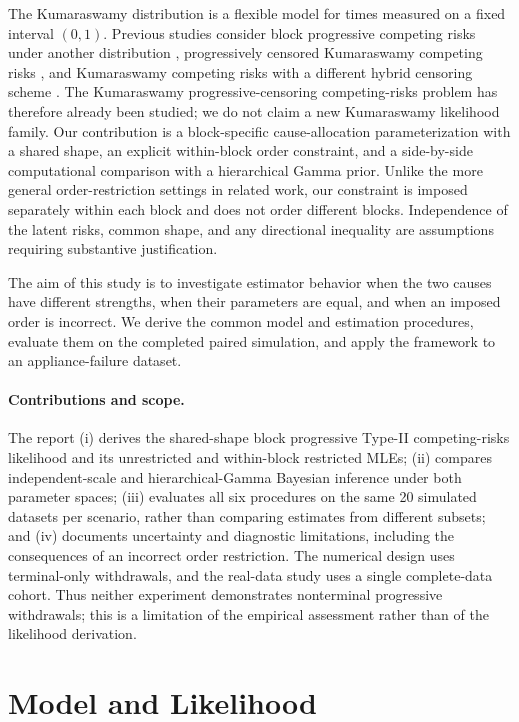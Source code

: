 \documentclass[a4paper,11pt]{article}
\begin{document}
The Kumaraswamy distribution is a flexible model for times measured on a fixed interval $(0,1)$. Previous studies consider block progressive competing risks under another distribution \cite{wang2023}, progressively censored Kumaraswamy competing risks \cite{wang2018}, and Kumaraswamy competing risks with a different hybrid censoring scheme \cite{mahto2022}. The Kumaraswamy progressive-censoring competing-risks problem has therefore already been studied; we do not claim a new Kumaraswamy likelihood family. Our contribution is a block-specific cause-allocation parameterization with a shared shape, an explicit within-block order constraint, and a side-by-side computational comparison with a hierarchical Gamma prior. Unlike the more general order-restriction settings in related work, our constraint is imposed separately within each block and does not order different blocks. Independence of the latent risks, common shape, and any directional inequality are assumptions requiring substantive justification.

The aim of this study is to investigate estimator behavior when the two causes have different strengths, when their parameters are equal, and when an imposed order is incorrect. We derive the common model and estimation procedures, evaluate them on the completed paired simulation, and apply the framework to an appliance-failure dataset.

\paragraph{Contributions and scope.}
The report (i) derives the shared-shape block progressive Type-II competing-risks likelihood and its unrestricted and within-block restricted MLEs; (ii) compares independent-scale and hierarchical-Gamma Bayesian inference under both parameter spaces; (iii) evaluates all six procedures on the same 20 simulated datasets per scenario, rather than comparing estimates from different subsets; and (iv) documents uncertainty and diagnostic limitations, including the consequences of an incorrect order restriction. The numerical design uses terminal-only withdrawals, and the real-data study uses a single complete-data cohort. Thus neither experiment demonstrates nonterminal progressive withdrawals; this is a limitation of the empirical assessment rather than of the likelihood derivation.

\section{Model and Likelihood}\label{sec:model}
\end{document}
